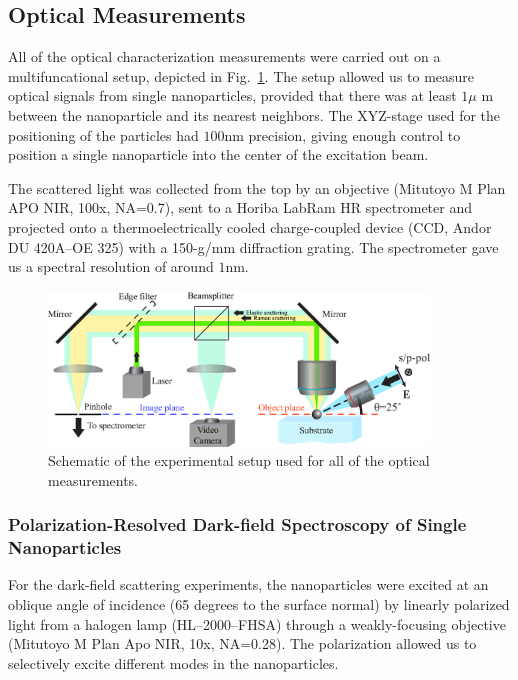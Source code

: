     \clearpage
    \subsection{Optical Measurements}
            All of the optical characterization measurements were carried out on a multifuncational setup, depicted in
            Fig.~\ref{fig:expSetup}. The setup allowed us to measure optical signals from single nanoparticles, provided that
            there was at least $1\mu$ m between the nanoparticle and its nearest neighbors. The XYZ-stage used for the
            positioning of the particles had $100$nm precision, giving enough control to position a single nanoparticle into
            the center of the excitation beam.

            The scattered light was collected from the top by an objective (Mitutoyo M Plan APO NIR, 100x, NA=0.7),
            sent to a Horiba LabRam HR spectrometer and projected onto a thermoelectrically cooled charge-coupled device
            (CCD, Andor DU 420A--OE 325) with a 150-g/mm diffraction grating. The spectrometer gave us a spectral resolution
            of around $1$nm.

            \begin{figure}[!ht]
                    \begin{center}
                        \includegraphics[width=0.9\textwidth]{figs/methods/expSetup2.eps}
                    \end{center}
                    \caption{Schematic of the experimental setup used for all of the optical measurements.}
                    \label{fig:expSetup}
            \end{figure}

        \subsubsection{Polarization-Resolved Dark-field Spectroscopy of Single Nanoparticles}
            \label{sec:Darkfield}
                For the dark-field scattering experiments, the nanoparticles were excited at an oblique angle of incidence
            (65 degrees to the surface normal) by linearly polarized light from a halogen lamp (HL--2000--FHSA)
            through a weakly-focusing objective (Mitutoyo M Plan Apo NIR, 10x, NA=0.28). The polarization allowed us to
            selectively excite different modes in the nanoparticles\cite{permyakov2015probing}.

